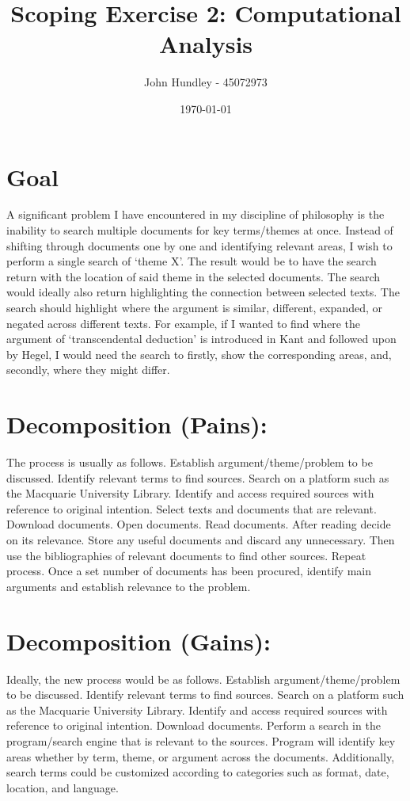 \documentclass[a4paper,12pt]{article}
\title{Scoping Exercise 2: Computational Analysis}
\author{John Hundley - 45072973}
\date{\today}
\begin{document}
\maketitle

\section{Goal}

A significant problem I have encountered in my discipline of philosophy is the inability to search multiple documents for key terms/themes at once. Instead of shifting through documents one by one and identifying relevant areas, I wish to perform a single search of ‘theme X’. The result would be to have the search return with the location of said theme in the selected documents. The search would ideally also return highlighting the connection between selected texts. The search should highlight where the argument is similar, different, expanded, or negated across different texts. For example, if I wanted to find where the argument of ‘transcendental deduction’ is introduced in Kant and followed upon by Hegel, I would need the search to firstly, show the corresponding areas, and, secondly, where they might differ. 

\section{Decomposition (Pains):}

The process is usually as follows. Establish argument/theme/problem to be discussed. Identify relevant terms to find sources. Search on a platform such as the Macquarie University Library. Identify and access required sources with reference to original intention. Select texts and documents that are relevant. Download documents. Open documents. Read documents. After reading decide on its relevance. Store any useful documents and discard any unnecessary. Then use the bibliographies of relevant documents to find other sources. Repeat process. Once a set number of documents has been procured, identify main arguments and establish relevance to the problem. 

\section{Decomposition (Gains):}

Ideally, the new process would be as follows. Establish argument/theme/problem to be discussed. Identify relevant terms to find sources. Search on a platform such as the Macquarie University Library. Identify and access required sources with reference to original intention. Download documents. Perform a search in the program/search engine that is relevant to the sources. Program will identify key areas whether by term, theme, or argument across the documents. Additionally, search terms could be customized according to categories such as format, date, location, and language. 
\end{document}
